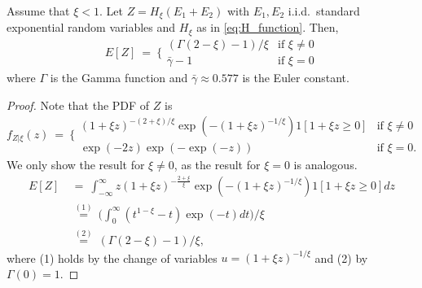 \begin{lemma}\label{lem:sp-revenue}
Assume that $\xi<1$. Let $Z=H_{\xi }( E_{1}+E_{2}) $ with $E_{1},E_{2}$ i.i.d.\ standard exponential random variables and $H_{\xi }$ as in \eqref{eq:H_function}. Then, 
\begin{equation*}
    E[ Z] ~=~\bigg\{ 
\begin{array}{ll}
(\Gamma (2-\xi )-1)/\xi  & \text{if }\xi \not=0 \\ 
\bar{\gamma}-1 & \text{if }\xi =0
\end{array}
\end{equation*}
where $\Gamma $ is the Gamma function and $\bar{\gamma}\approx 0.577$ is the Euler constant.
\end{lemma}
\begin{proof}
Note that the PDF of $Z$ is
\begin{equation*}
f_{Z|\xi}( z)~=~\bigg\{ 
\begin{array}{ll}
( 1+\xi z) ^{-{(2+\xi) }/{\xi }}\exp ( -( 1+\xi z) ^{-1/\xi }) 1[ 1+\xi z\geq 0]  & \text{if }\xi \neq 0 \\ 
\exp ( -2z) \exp ( -\exp ( -z) )  & \text{if }\xi =0.
\end{array}
\end{equation*}
We only show the result for $\xi  \not=0$, as the result for $\xi =0$ is analogous.
\begin{align*}
E[ Z]  &~=~\int_{-\infty }^{\infty }z( 1+\xi z) ^{-\tfrac{2+\xi }{\xi }}\exp ( -( 1+\xi z) ^{-1/\xi }) 1[ 1+\xi z\geq 0] dz \\
&~\overset{(1)}{=}~\big( \int_{0}^{\infty }( t^{1-\xi }-t) \exp ( -t) dt\big) /\xi  \\
&~\overset{(2)}{=}~( \Gamma ( 2-\xi ) -1) /\xi ,
\end{align*}
where (1) holds by the change of variables $u=( 1+\xi z) ^{-1/\xi }$ and (2) by $\Gamma(0)=1$. 
\end{proof}



